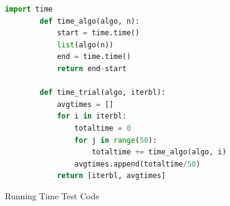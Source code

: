 \documentclass{amsart}
\theoremstyle{definition}
\theoremstyle{case}
\begin{document}
	\begin{figure}[H]\caption{Running Time Test Code}
		\begin{lstlisting}[language=Python]
        import time
        def time_algo(algo, n):
            start = time.time()
            list(algo(n))
            end = time.time()
            return end-start
        
        def time_trial(algo, iterbl):
            avgtimes = []
            for i in iterbl:
                totaltime = 0
                for j in range(50):
                    totaltime += time_algo(algo, i)
                avgtimes.append(totaltime/50)
            return [iterbl, avgtimes]
		\end{lstlisting}
	\end{figure}

	
	
\end{document}
